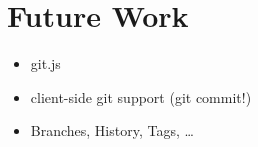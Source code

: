 \section{Future Work}
\label{sec:Related_Work}

\begin{itemize}
	\item git.js
	\item client-side git support (git commit!)
	\item Branches, History, Tags, \dots
\end{itemize}